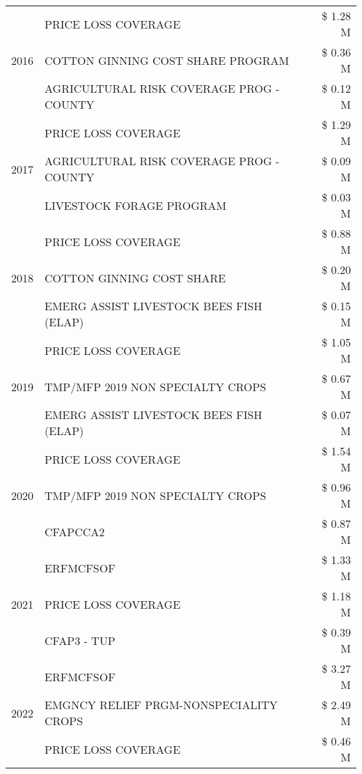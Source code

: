 \begin{tabular}{llr}
\cline{1-3}
\multirow[t]{3}{*}{2016} & PRICE LOSS COVERAGE & \$ 1.28 M \\
 & COTTON GINNING COST SHARE PROGRAM & \$ 0.36 M \\
 & AGRICULTURAL RISK COVERAGE PROG - COUNTY & \$ 0.12 M \\
\cline{1-3}
\multirow[t]{3}{*}{2017} & PRICE LOSS COVERAGE & \$ 1.29 M \\
 & AGRICULTURAL RISK COVERAGE PROG - COUNTY & \$ 0.09 M \\
 & LIVESTOCK FORAGE PROGRAM & \$ 0.03 M \\
\cline{1-3}
\multirow[t]{3}{*}{2018} & PRICE LOSS COVERAGE & \$ 0.88 M \\
 & COTTON GINNING COST SHARE & \$ 0.20 M \\
 & EMERG ASSIST LIVESTOCK BEES FISH (ELAP) & \$ 0.15 M \\
\cline{1-3}
\multirow[t]{3}{*}{2019} & PRICE LOSS COVERAGE & \$ 1.05 M \\
 & TMP/MFP 2019 NON SPECIALTY CROPS & \$ 0.67 M \\
 & EMERG ASSIST LIVESTOCK BEES FISH (ELAP) & \$ 0.07 M \\
\cline{1-3}
\multirow[t]{3}{*}{2020} & PRICE LOSS COVERAGE & \$ 1.54 M \\
 & TMP/MFP 2019 NON SPECIALTY CROPS & \$ 0.96 M \\
 & CFAPCCA2 & \$ 0.87 M \\
\cline{1-3}
\multirow[t]{3}{*}{2021} & ERFMCFSOF & \$ 1.33 M \\
 & PRICE LOSS COVERAGE & \$ 1.18 M \\
 & CFAP3 - TUP & \$ 0.39 M \\
\cline{1-3}
\multirow[t]{3}{*}{2022} & ERFMCFSOF & \$ 3.27 M \\
 & EMGNCY RELIEF PRGM-NONSPECIALITY CROPS & \$ 2.49 M \\
 & PRICE LOSS COVERAGE & \$ 0.46 M \\
\cline{1-3}
\bottomrule
\end{tabular}
